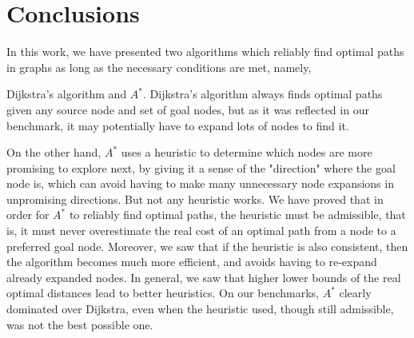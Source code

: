 \documentclass[a4paper,10pt]{report}
\begin{document}
%
%
%
%




\chapter{Conclusions}
In this work, we have presented two algorithms which reliably find optimal paths in graphs as long as the necessary conditions are met, namely, 

Dijkstra's algorithm and $A^*$. Dijkstra's algorithm always finds optimal paths given any source node and set of goal nodes, but as it was reflected in our benchmark, it may potentially have to expand lots of nodes to find it. 

On the other hand, $A^*$ uses a heuristic to determine which nodes are more promising to explore next, by giving it a sense of the "direction" where the goal node is, which can avoid having to make many unnecessary node expansions in unpromising directions. But not any heuristic works. We have proved that in order for $A^*$ to reliably find optimal paths, the heuristic must be admissible, that is, it must never overestimate the real cost of an optimal path from a node to a preferred goal node. Moreover, we saw that if the heuristic is also consistent, then the algorithm becomes much more efficient, and avoids having to re-expand already expanded nodes. In general, we saw that higher lower bounds of the real optimal distances lead to better heuristics. On our benchmarks, $A^*$ clearly dominated over Dijkstra, even when the heuristic used, though still admissible, was not the best possible one.
\end{document}

